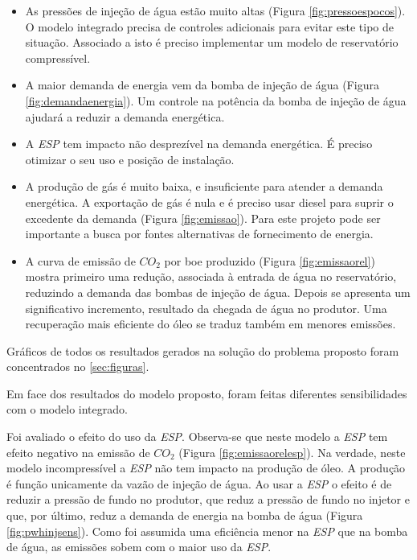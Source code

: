 \documentclass[final,5p]{elsarticle}
\numberwithin{equation}{section}
\begin{document}
        \begin{itemize}
            \item As pressões de injeção de água estão muito altas (Figura \ref{fig:pressoespocos}). O modelo integrado precisa de controles adicionais para evitar este tipo de situação. Associado a isto é preciso implementar um modelo de reservatório compressível.
            \item A maior demanda de energia vem da bomba de injeção de água (Figura \ref{fig:demandaenergia}). Um controle na potência da bomba de injeção de água ajudará a reduzir a demanda energética.
            \item A \emph{ESP} tem impacto não desprezível na demanda energética. É preciso otimizar o seu uso e posição de instalação.
            \item A produção de gás é muito baixa, e insuficiente para atender a demanda energética. A exportação de gás é nula e é preciso usar diesel para suprir o excedente da demanda (Figura \ref{fig:emissao}). Para este projeto pode ser importante a busca por fontes alternativas de fornecimento de energia.
            \item A curva de emissão de $CO_2$ por boe produzido (Figura \ref{fig:emissaorel}) mostra primeiro uma redução, associada à entrada de água no reservatório, reduzindo a demanda das bombas de injeção de água. Depois se apresenta um significativo incremento, resultado da chegada de água no produtor. Uma recuperação mais eficiente do óleo se traduz também em menores emissões.
        \end{itemize}

        Gráficos de todos os resultados gerados na solução do problema proposto foram concentrados no \ref{sec:figuras}.

        Em face dos resultados do modelo proposto, foram feitas diferentes sensibilidades com o modelo integrado.

        Foi avaliado o efeito do uso da \emph{ESP}. Observa-se que neste modelo a \emph{ESP} tem efeito negativo na emissão de $CO_2$ (Figura \ref{fig:emissaorelesp}). Na verdade, neste modelo incompressível a \emph{ESP} não tem impacto na produção de óleo. A produção é função unicamente da vazão de injeção de água. Ao usar a \emph{ESP} o efeito é de reduzir a pressão de fundo no produtor, que reduz a pressão de fundo no injetor e que, por último, reduz a demanda de energia na bomba de água (Figura \ref{fig:pwhinjsens}). Como foi assumida uma eficiência menor na \emph{ESP} que na bomba de água, as emissões sobem com o maior uso da \emph{ESP}.
\end{document}
